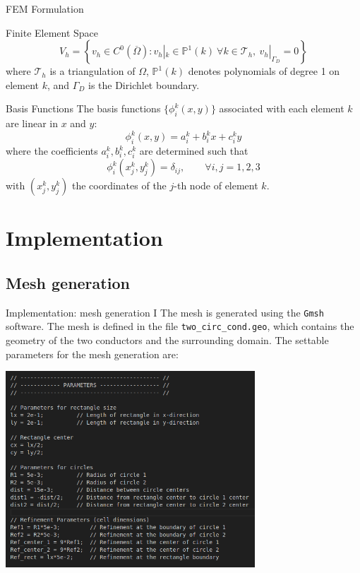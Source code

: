 \documentclass[aspectratio=54,xcolor=dvipsnames]{beamer}
\begin{document}
\begin{frame}{FEM Formulation}
    \begin{block}{Finite Element Space}
    \[
    V_h = \left\{ v_h \in C^0(\overline{\Omega}) : v_h|_k \in \mathbb{P}^1(k)\ \forall k \in \mathcal{T}_h,\ v_h|_{\Gamma_D} = 0 \right\}
    \]
    where $\mathcal{T}_h$ is a triangulation of $\Omega$, $\mathbb{P}^1(k)$ denotes polynomials of degree 1 on element $k$, and $\Gamma_D$ is the Dirichlet boundary.
    \end{block}
    \begin{block}{Basis Functions}
    The basis functions $\{\phi_i^k(x, y)\}$ associated with each element $k$ are linear in $x$ and $y$:
    \[
    \phi_i^k(x, y) = a_i^k + b_i^k x + c_i^k y
    \]
    where the coefficients $a_i^k, b_i^k, c_i^k$ are determined such that
    \[
    \phi_i^k(x_j^k, y_j^k) = \delta_{ij}, \qquad \forall i, j = 1,2,3
    \]
    with $(x_j^k, y_j^k)$ the coordinates of the $j$-th node of element $k$.
    \end{block}
    
\end{frame}

\section{Implementation}
\subsection{Mesh generation}
\begin{frame}{Implementation: mesh generation I}
    The mesh is generated using the \texttt{Gmsh} software. The mesh is defined in the file \texttt{two\_circ\_cond.geo}, which contains the geometry of the two conductors and the surrounding domain. The settable parameters for the mesh generation are:
    \begin{center}
         \includegraphics[width=0.7\textwidth]{Images/Gmsh_parameters.png}
    \end{center}
\end{frame}
\end{document}
